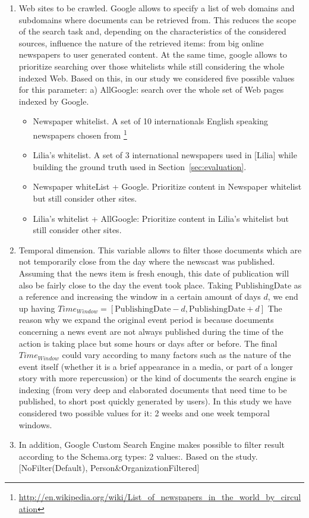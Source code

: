 \documentclass{llncs}
\begin{document}
\begin{enumerate}
\item Web sites to be crawled. Google allows to specify a list of web domains and subdomains where documents can be retrieved from. This reduces the scope of the search task and, depending on the characteristics of the considered sources, influence the nature of the retrieved items: from big online newspapers to user generated content. At the same time, google allows to prioritize searching over those whitelists while still considering the  whole indexed Web. Based on this, in our study we considered five possible values for this parameter:
a) AllGoogle: search over the whole set of Web pages indexed by Google.
 \begin{itemize}
 \item Newspaper whitelist. A set of 10 internationals English speaking newspapers chosen from \footnote{\fontsize{8pt}{1em}\selectfont  \url{ http://en.wikipedia.org/wiki/List_of_newspapers_in_the_world_by_circulation}}  
 \item Lilia's whitelist. A set of 3 international newspapers used in [Lilia] while building the ground truth used in Section~\ref{sec:evaluation}.
 \item Newspaper whiteList + Google. Prioritize content in Newspaper whitelist but still consider other sites.
 \item Lilia's whitelist + AllGoogle: Prioritize content in Lilia's whitelist but still consider other sites.
\end{itemize}
\item Temporal dimension. This variable allows to filter those documents which are not temporarily close from the day where the newscast was published. Assuming that the news item is fresh enough, this date of publication will also be fairly close to the day the event  took place. Taking $\text{PublishingDate}$ as a reference and increasing the window in a certain amount of days $d$,  we end up having $Time_{Window}=\left [ \text{PublishingDate}-d, \text{PublishingDate}+d \right ]$ The reason why we expand the original event period is because documents concerning a news event are not always published during the time of the action is taking place but some hours or days after or before. The final $Time_{Window}$ could vary according to many factors such as the nature of the event itself (whether it is a brief appearance in a media, or part of a longer story with more repercussion) or the kind of documents the search engine is indexing (from very deep and elaborated documents that need time to be published, to short post quickly generated by users). In this study we have considered two possible values for it: 2 weeks and one week temporal windows.

\item In addition, Google Custom Search Engine makes possible to filter result according to the Schema.org types: 2 values:. Based on the study. 
[NoFilter(Default), Person\&OrganizationFiltered]
\end{enumerate}
\end{document}
